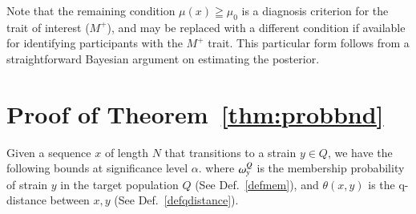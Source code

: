 \documentclass[onecolumn,10pt]{IEEEtran}
\begin{document}
Note that the remaining condition $\mu(x) \geqq \mu_0$ is a diagnosis criterion for the trait of interest ($M^+$), and may be replaced with a different condition if available for identifying participants with  the $M^+$ trait. This particular form follows from a straightforward Bayesian argument on estimating the posterior.

\section{Proof of Theorem~\ref{thm:probbnd}}\label{secproof}


\begin{thm}\label{thmbnd}
  Given a sequence  $x$ of length $N$ that transitions  to a strain $y\in Q$, we have the following bounds at significance level $\alpha$.
  where $\omega_{y}^Q$ is the membership probability of strain $y$ in the target population $Q$ (See Def.~\ref{defmem}), and $\theta(x,y)$ is the q-distance between $x,y$ (See Def.~\ref{defqdistance}).
\end{thm}
\end{document}
